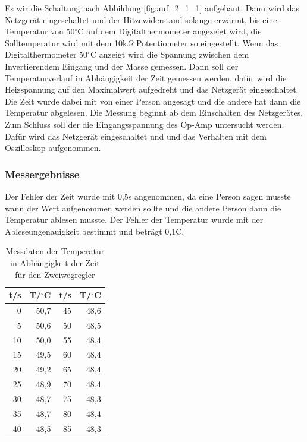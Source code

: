 \documentclass[12pt,a4paper]{article}
\begin{document}
Es wir die Schaltung nach Abbildung \ref{fig:auf_2_1_1} aufgebaut. Dann wird das Netzgerät eingeschaltet und der Hitzewiderstand solange erwärmt, bis eine Temperatur von 50$^\circ$C auf dem Digitalthermometer angezeigt wird, die Solltemperatur wird mit dem 10k$\Omega$ Potentiometer so eingestellt. Wenn das Digitalthermometer 50$^\circ$C anzeigt wird die Spannung zwischen dem Invertierendem Eingang und der Masse gemessen. Dann soll der Temperaturverlauf in Abhängigkeit der Zeit gemessen werden, dafür wird die Heizspannung auf den Maximalwert aufgedreht und das Netzgerät eingeschaltet. Die Zeit wurde dabei mit von einer Person angesagt und die andere hat dann die Temperatur abgelesen. Die Messung beginnt ab dem Einschalten des Netzgerätes. Zum Schluss soll der die Eingangsspannung des Op-Amp untersucht werden. Dafür wird das Netzgerät eingeschaltet und und das Verhalten mit dem Oszilloskop aufgenommen.

\subsubsection*{Messergebnisse}

Der Fehler der Zeit wurde mit 0,5s angenommen, da eine Person sagen musste wann der Wert aufgenommen werden sollte und die andere Person dann die Temperatur ablesen musste. Der Fehler der Temperatur wurde mit der Ableseungenauigkeit bestimmt und beträgt 0,1C.

\begin{table}[htbp]
\centering
\begin{tabular}{r|rr|r}

t/s & T/$^\circ$C & t/s & T/$^\circ$C \\ \hline
0 & 50,7 & 45 & 48,6 \\ 
5 & 50,6 & 50 & 48,5 \\ 
10 & 50,0 & 55 & 48,4 \\ 
15 & 49,5 & 60 & 48,4 \\ 
20 & 49,2 & 65 & 48,4 \\ 
25 & 48,9 & 70 & 48,4 \\ 
30 & 48,7 & 75 & 48,3 \\ 
35 & 48,7 & 80 & 48,4 \\ 
40 & 48,5 & 85 & 48,3 \\ 
\end{tabular}
\caption{Messdaten der Temperatur in Abhängigkeit der Zeit für den Zweiwegregler}
\label{tab:2_1}
\end{table}
\end{document}
